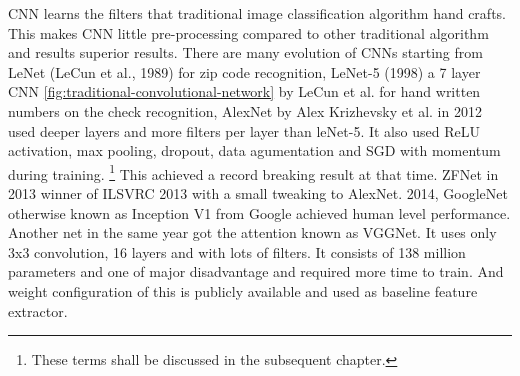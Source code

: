 \newpara CNN learns the filters that traditional image classification algorithm hand crafts. This makes CNN little pre-processing compared to other traditional algorithm and results superior results. There are many evolution of CNNs starting from LeNet (LeCun et al., 1989) for zip code recognition, LeNet-5 (1998) a 7 layer CNN \ref{fig:traditional-convolutional-network} by LeCun et al. for hand written numbers on the check recognition, AlexNet by Alex Krizhevsky et al. in 2012 used deeper layers and more filters per layer than leNet-5. It also used ReLU activation, max pooling, dropout, data agumentation and SGD with momentum during training. \footnote{These terms shall be discussed in the subsequent chapter.} This achieved a record breaking result at that time. ZFNet in 2013 winner of ILSVRC 2013 with a small tweaking to AlexNet. 2014, GoogleNet otherwise known as Inception V1 from Google achieved human level performance. Another net in the same year got the attention known as VGGNet. It uses only 3x3 convolution, 16 layers and with lots of filters. It consists of 138 million parameters and one of major disadvantage and required more time to train. And weight configuration of this is publicly available and used as baseline feature extractor.


